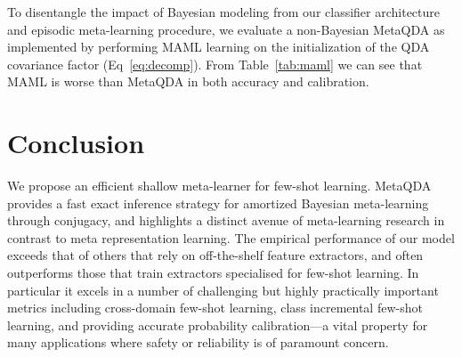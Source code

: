 \documentclass[10pt,twocolumn,letterpaper]{article}
\def\miniIN{\textit{mini}ImageNet}
\begin{document}
 To disentangle the impact of Bayesian modeling from our classifier architecture and episodic meta-learning procedure, we evaluate a non-Bayesian MetaQDA as implemented by performing MAML learning on the  initialization of the QDA covariance factor  (Eq~\ref{eq:decomp}). From Table~\ref{tab:maml} we can see that MAML is worse than MetaQDA in both accuracy and calibration.

\setlength{\tabcolsep}{4.8pt}
\begin{table}[h]
\centering
\footnotesize
{}
\caption{\small \small 
\bf{Comparison of Bayesian vs. non-Bayesian (MAML-based) realisaton of MetaQDA on \miniIN.}
}
\vspace{-1.5em}
\label{tab:maml}
\end{table}



\section{Conclusion}
We propose an efficient shallow meta-learner for few-shot learning. MetaQDA provides a fast exact inference strategy for amortized Bayesian meta-learning through conjugacy, and highlights a distinct avenue of meta-learning research in contrast to meta representation learning. 
The empirical performance of our model exceeds that of others that rely on off-the-shelf feature extractors, and often outperforms those that train extractors specialised for few-shot learning. In particular it excels in a number of challenging but highly practically important metrics including cross-domain few-shot learning, class incremental few-shot learning, and providing accurate probability calibration---a vital property for many applications where safety or reliability is of paramount concern.
\end{document}
